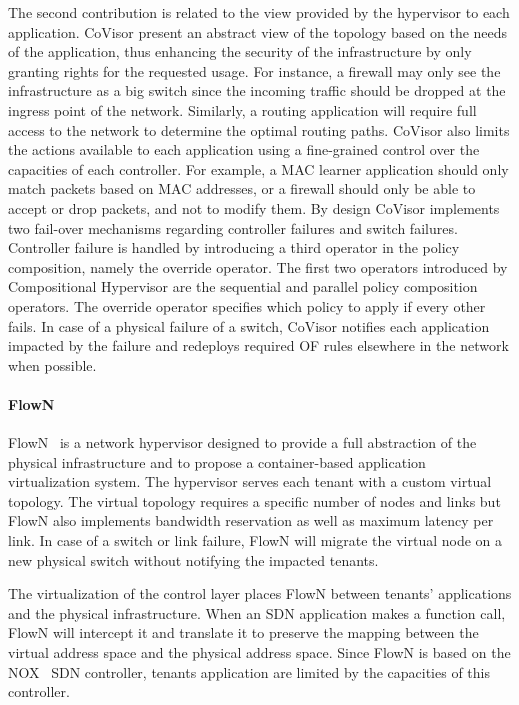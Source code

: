 The second contribution is related to the view provided by the hypervisor to each application.
CoVisor present an abstract view of the topology based on the needs of the application, thus enhancing the security of the infrastructure by only granting rights for the requested usage. 
For instance, a firewall may only see the infrastructure as a big switch since the incoming traffic should be dropped at the ingress point of the network.
Similarly, a routing application will require full access to the network to determine the optimal routing paths.
CoVisor also limits the actions available to each application using a fine-grained control over the capacities of each controller.
For example, a MAC learner application should only match packets based on MAC addresses, or a firewall should only be able to accept or drop packets, and not to modify them.
By design CoVisor implements two fail-over mechanisms regarding controller failures and switch failures.
Controller failure is handled by introducing a third operator in the policy composition, namely the override operator. The first two operators introduced by Compositional Hypervisor are the sequential and parallel policy composition operators. The override operator specifies which policy to apply if every other fails.
In case of a physical failure of a switch, CoVisor notifies each application impacted by the failure and redeploys required OF rules elsewhere in the network when possible.


\paragraph{FlowN}
FlowN~\cite{FlowN-Drutskoy2012} is a network hypervisor designed to provide a full abstraction of the physical infrastructure and to propose a container-based application virtualization system. 
The hypervisor serves each tenant with a custom virtual topology. The virtual topology requires a specific number of nodes and links but FlowN also implements bandwidth reservation as well as maximum latency per link. 
In case of a switch or link failure, FlowN will migrate the virtual node on a new physical switch without notifying the impacted tenants.

The virtualization of the control layer places FlowN between tenants' applications and the physical infrastructure. 
When an SDN application makes a function call, FlowN will intercept it and translate it to preserve the mapping between the virtual address space and the physical address space. Since FlowN is based on the NOX~\cite{nox-gude2008} SDN controller, tenants application are limited by the capacities of this controller. 

